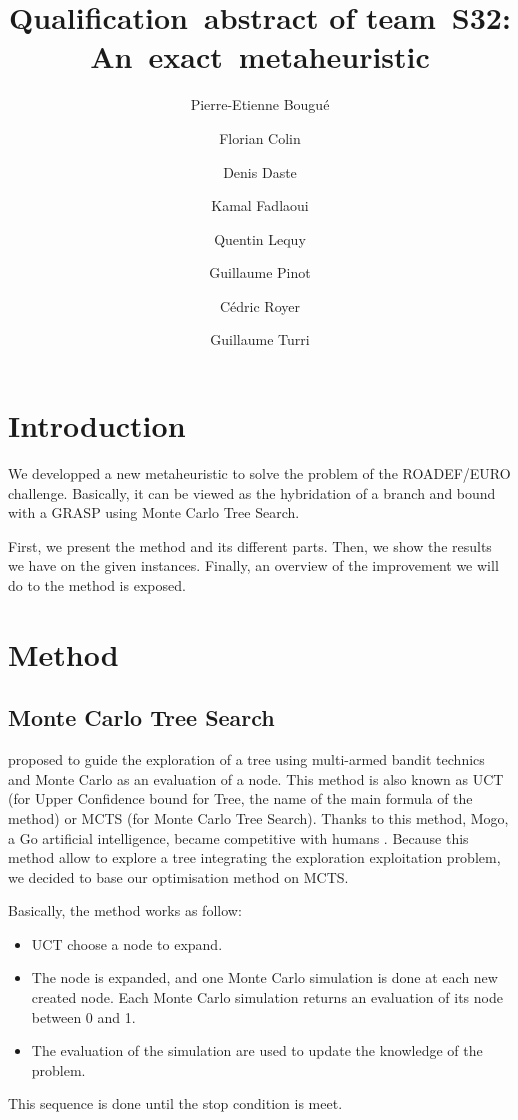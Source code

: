 \documentclass[a4paper,twocolumn]{article}
\title{Qualification~abstract of team~S32:
  An~exact~metaheuristic}
\author{Pierre-Etienne Bougué \and Florian Colin \and Denis Daste
  \and Kamal Fadlaoui \and Quentin Lequy \and Guillaume Pinot \and
  Cédric Royer \and Guillaume Turri}
\begin{document}
\maketitle

\section{Introduction}

We developped a new metaheuristic to solve the problem of the
ROADEF/EURO challenge.  Basically, it can be viewed as the hybridation
of a branch and bound with a GRASP using Monte Carlo Tree Search.

First, we present the method and its different parts.  Then, we show
the results we have on the given instances. Finally, an overview of
the improvement we will do to the method is exposed.

\section{Method}

\subsection{Monte Carlo Tree Search}

\cite{kocsis2006bandit} proposed to guide the exploration of a tree
using multi-armed bandit technics and Monte Carlo as an evaluation of
a node.  This method is also known as UCT (for Upper Confidence bound
for Tree, the name of the main formula of the method) or MCTS (for
Monte Carlo Tree Search).  Thanks to this method, Mogo, a Go
artificial intelligence, became competitive with humans
\cite{gelly2007contribution}.  Because this method allow to explore a
tree integrating the exploration exploitation problem, we decided to
base our optimisation method on MCTS.

Basically, the method works as follow:
\begin{itemize}
\item UCT choose a node to expand.
\item The node is expanded, and one Monte Carlo simulation is done at
  each new created node. Each Monte Carlo simulation returns an
  evaluation of its node between 0 and 1.
\item The evaluation of the simulation are used to update the
  knowledge of the problem.
\end{itemize}
This sequence is done until the stop condition is meet.
\end{document}
